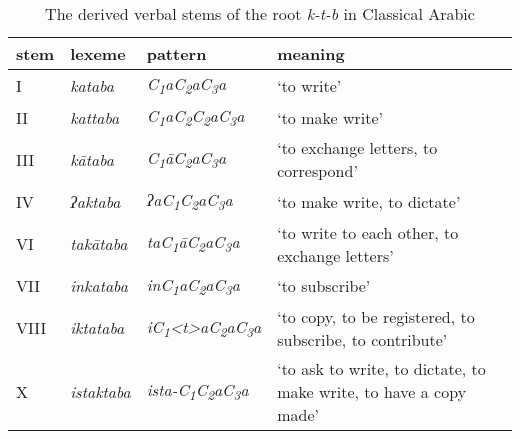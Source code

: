 \documentclass[output=paper]{langscibook}
\begin{document}
\begin{table}
    \begin{tabularx}{\textwidth}{lllQ}\midrule\toprule
        stem & lexeme & pattern & meaning \\\midrule
        I & \textit{kataba} & \textit{C\textsubscript{1}aC\textsubscript{2}aC\textsubscript{3}a} & ‘to write’ \\
        II & \textit{kattaba} & \textit{C\textsubscript{1}aC\textsubscript{2}C\textsubscript{2}aC\textsubscript{3}a} & ‘to make write’ \\
        III & \textit{kātaba} & \textit{C\textsubscript{1}āC\textsubscript{2}aC\textsubscript{3}a} & ‘to exchange letters, to correspond’ \\
        IV & \textit{ʔaktaba} & \textit{ʔaC\textsubscript{1}C\textsubscript{2}aC\textsubscript{3}a} & ‘to make write, to dictate’ \\
        VI & \textit{takātaba} & \textit{taC\textsubscript{1}āC\textsubscript{2}aC\textsubscript{3}a} & ‘to write to each other, to exchange letters’ \\
        VII & \textit{inkataba} & \textit{inC\textsubscript{1}aC\textsubscript{2}aC\textsubscript{3}a} & ‘to subscribe’ \\
        VIII & \textit{iktataba} & \textit{iC\textsubscript{1}<t>aC\textsubscript{2}aC\textsubscript{3}a} & ‘to copy, to be registered, to subscribe, to contribute’ \\
        X & \textit{istaktaba} & \textit{ista-C\textsubscript{1}C\textsubscript{2}aC\textsubscript{3}a} & ‘to ask to write, to dictate, to make write, to have a copy made’\\ \bottomrule\midrule
    \end{tabularx}
    \caption{The derived verbal stems of the root \textit{k-t-b} in Classical Arabic}
    \label{doehla:tab:2}
\end{table}
\end{document}
